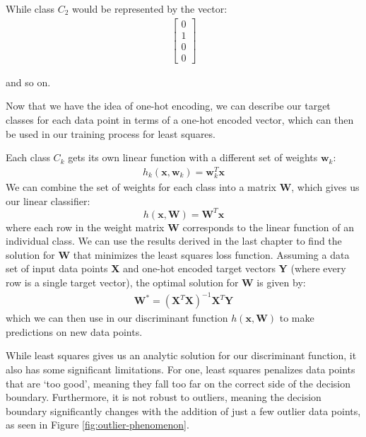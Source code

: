 While class $C_{2}$ would be represented by the vector:
\begin{align}
    \begin{bmatrix}
    	0 \\
        1 \\
        0 \\
        0
    \end{bmatrix}
\end{align}

and so on.

Now that we have the idea of one-hot encoding, we can describe our target classes for each data point in terms of a one-hot encoded vector, which can then be used in our training process for least squares.

Each class $C_{k}$ gets its own linear function with a different set of weights $\textbf{w}_{k}$:
\begin{align*}
	h_{k}(\textbf{x}, \textbf{w}_{k}) = \textbf{w}_{k}^{T}\textbf{x}
\end{align*}
We can combine the set of weights for each class into a matrix $\textbf{W}$, which gives us our linear classifier:
\begin{equation}
	h(\textbf{x}, \textbf{W}) = \textbf{W}^{T}\textbf{x}
\end{equation}
where each row in the weight matrix \textbf{W} corresponds to the linear function of an individual class. We can use the results derived in the last chapter to find the solution for \textbf{W} that minimizes the least squares loss function. Assuming a data set of input data points \textbf{X} and one-hot encoded target vectors \textbf{Y} (where every row is a single target vector), the optimal solution for \textbf{W} is given by:
\begin{align*}
	\textbf{W}^{*} = (\textbf{X}^{T}\textbf{X})^{-1}\textbf{X}^{T}\textbf{Y}
\end{align*}
which we can then use in our discriminant function $h(\textbf{x}, \textbf{W})$ to make predictions on new data points.

While least squares gives us an analytic solution for our discriminant function, it also has some significant limitations. For one, least squares penalizes data points that are `too good', meaning they fall too far on the correct side of the decision boundary. Furthermore, it is not robust to outliers, meaning the decision boundary significantly changes with the addition of just a few outlier data points, as seen in Figure \ref{fig:outlier-phenomenon}.

